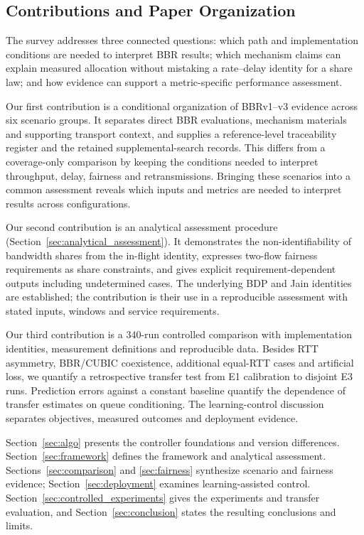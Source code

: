 \documentclass[a4paper,fleqn]{cas-sc}
\begin{document}
\subsection{Contributions and Paper Organization}
\label{sec:contrib}

The survey addresses three connected questions: which path and
implementation conditions are needed to interpret BBR results; which
mechanism claims can explain measured allocation without mistaking a
rate--delay identity for a share law; and how evidence can support a
metric-specific performance assessment.

Our first contribution is a conditional organization of BBRv1--v3 evidence
across six scenario groups. It separates direct BBR evaluations, mechanism
materials and supporting transport context, and supplies a reference-level
traceability register and the retained supplemental-search records.
This differs from a coverage-only comparison by keeping the conditions
needed to interpret throughput, delay, fairness and retransmissions.
Bringing these scenarios into a common assessment reveals which inputs
and metrics are needed to interpret results across configurations.

Our second contribution is an analytical assessment procedure
(Section~\ref{sec:analytical_assessment}). It demonstrates the
non-identifiability of bandwidth shares from the in-flight identity,
expresses two-flow fairness requirements as share constraints, and gives
explicit requirement-dependent outputs including undetermined cases.
The underlying BDP and Jain identities are established; the contribution
is their use in a reproducible assessment with stated inputs, windows and
service requirements.

Our third contribution is a 340-run controlled comparison with
implementation identities, measurement definitions and reproducible data.
Besides RTT asymmetry, BBR/CUBIC coexistence, additional equal-RTT cases
and artificial loss, we quantify a retrospective transfer test from E1
calibration to disjoint E3 runs. Prediction errors against a constant baseline quantify the dependence
of transfer estimates on queue conditioning. The learning-control discussion separates objectives,
measured outcomes and deployment evidence.

Section~\ref{sec:algo} presents the controller foundations and version
differences. Section~\ref{sec:framework} defines the framework and analytical
assessment. Sections~\ref{sec:comparison} and \ref{sec:fairness} synthesize
scenario and fairness evidence; Section~\ref{sec:deployment} examines
learning-assisted control. Section~\ref{sec:controlled_experiments} gives the
experiments and transfer evaluation, and Section~\ref{sec:conclusion}
states the resulting conclusions and limits.
\end{document}

